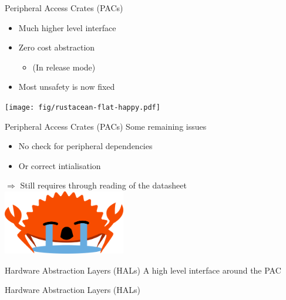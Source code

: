 \documentclass[aspectratio=169]{beamer}
\begin{document}
\begin{frame}{Peripheral Access Crates (PACs)}
    \begin{itemize}
        \item{Much higher level interface}
        \item{Zero cost abstraction}
        \begin{itemize}\item{(In release mode)}\end{itemize}
        \item{Most unsafety is now fixed}
    \end{itemize}
    \hspace*{5cm}\texttt{[image: fig/rustacean-flat-happy.pdf]}
\end{frame}

\begin{frame}{Peripheral Access Crates (PACs)}
    Some remaining issues
    \begin{itemize}
        \item{No check for peripheral dependencies}
        \item{Or correct intialisation}
    \end{itemize}

    $\Rightarrow$ Still requires through reading of the datasheet
    \hspace*{5cm}\includegraphics[width=0.40\textwidth]{fig/ferrisSob.png}
\end{frame}

\begin{frame}{Hardware Abstraction Layers (HALs)}
    A high level interface around the PAC
\end{frame}

\begin{frame}[fragile]{Hardware Abstraction Layers (HALs)}

    \begin{linehighlight}{
           {
          }
    }
        
    \end{linehighlight}
\end{frame}
\end{document}
